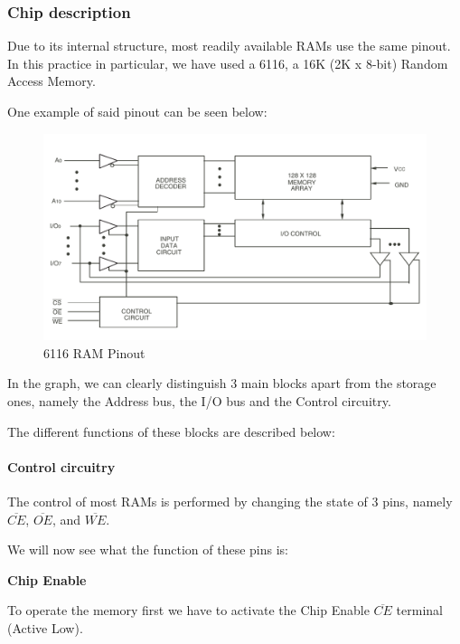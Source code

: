\subsubsection{Chip description}

Due to its internal structure, most readily available RAMs use the same pinout. In this practice in particular, we have used a 6116, a 16K (2K x 8-bit) Random Access Memory.\medskip

One example of said pinout can be seen below:

\begin{figure}[H]
    \centering
    \includegraphics[scale = 0.8]{Graphics/VHDL/Practice 6/RAM/RAM_IO.pdf}
    \caption{6116 RAM Pinout ~\autocite{6116}}
    \label{fig:<label>}
\end{figure}

\clearpage

In the graph, we can clearly distinguish 3 main blocks apart from the storage ones, namely the Address bus, the I/O bus and the Control circuitry.\medskip

The different functions of these blocks are described below:

\paragraph{Control circuitry}

The control of most RAMs is performed by changing the state of 3 pins, namely $\overline{CE}$, $\overline{OE}$, and $\overline{WE}$.\medskip

We will now see what the function of these pins is:\medskip


\textbf{Chip Enable} \medskip

To operate the memory first we have to activate the Chip Enable $\overline{CE}$ terminal (Active Low). \medskip

